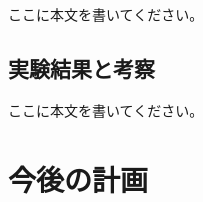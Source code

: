 \documentclass[no-page-number]{nanzan-abstract}
\begin{document}
ここに本文を書いてください。


%


\subsection{実験結果と考察}

%
%
%
%
%
%
%
%
%
%
%
%
%
%

ここに本文を書いてください。


\section{今後の計画}

%
%
%
%
%
%
%
%
%
%
\end{document}
